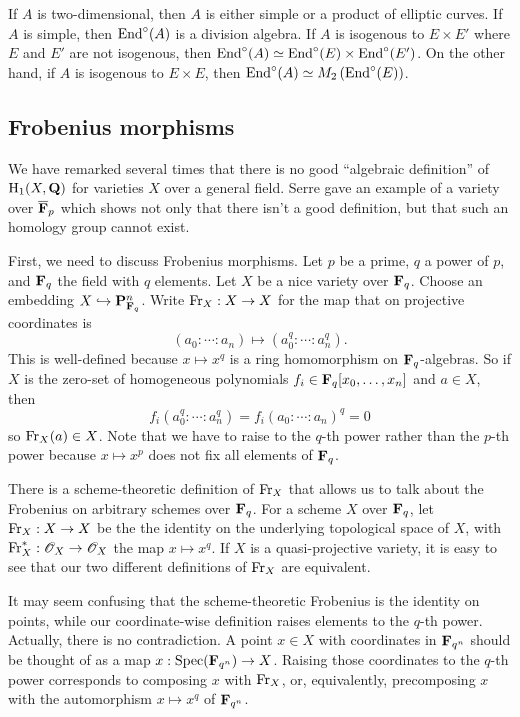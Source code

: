 \begin{example}
If $A$ is two-dimensional, then $A$ is either simple or a product of elliptic 
curves. If $A$ is simple, then $\operatorname{End}^\circ(A)$ is a division algebra. If $A$ 
is isogenous to $E\times E'$ where $E$ and $E'$ are not isogenous, then 
$\operatorname{End}^\circ(A)\simeq \operatorname{End}^\circ(E)\times \operatorname{End}^\circ(E')$. On the other hand, if 
$A$ is isogenous to $E\times E$, then 
$\operatorname{End}^\circ(A)\simeq M_2\left(\operatorname{End}^\circ(E)\right)$. 
\end{example}





\subsection{Frobenius morphisms}

We have remarked several times that there is no good ``algebraic definition'' 
of $\operatorname{H}_1(X,\mathbf{Q})$ for varieties $X$ over a general field. Serre gave an 
example of a variety over $\overline{\mathbf{F}}_p$ which shows not only that there 
isn't a good definition, but that such an homology group cannot exist. 

First, we need to discuss Frobenius morphisms. Let $p$ be a prime, $q$ a power 
of $p$, and $\mathbf{F}_q$ the field with $q$ elements. Let $X$ be a nice variety over 
$\mathbf{F}_q$. Choose an embedding $X\hookrightarrow \mathbf{P}_{\mathbf{F}_q}^n$. Write 
$\mathrm{Fr}_X:X\to X$ for the map that on projective coordinates is 
\[
  (a_0:\cdots:a_n) \mapsto (a_0^q:\cdots :a_n^q) \text{.}
\]
This is well-defined because $x\mapsto x^q$ is a ring homomorphism on 
$\mathbf{F}_q$-algebras. So if $X$ is the zero-set of homogeneous polynomials 
$f_i\in \mathbf{F}_q[x_0,\dots,x_n]$ and $a\in X$, then 
\[
  f_i(a_0^q:\cdots:a_n^q) = f_i(a_0:\cdots:a_n)^q = 0
\]
so $\mathrm{Fr}_X(a)\in X$. Note that we have to raise to the $q$-th power rather 
than the $p$-th power because $x\mapsto x^p$ does not fix all elements of 
$\mathbf{F}_q$. 

There is a scheme-theoretic definition of $\mathrm{Fr}_X$ that allows us to talk about 
the Frobenius on arbitrary schemes over $\mathbf{F}_q$. For a scheme $X$ over $\mathbf{F}_q$, let 
$\mathrm{Fr}_X:X\to X$ be the the identity on the underlying topological space of $X$, 
with $\mathrm{Fr}_X^\ast:\mathscr{O}_X\to \mathscr{O}_X$ the map $x\mapsto x^q$. If 
$X$ is a quasi-projective variety, it is easy to see that our two different 
definitions of $\mathrm{Fr}_X$ are equivalent. 

It may seem confusing that the scheme-theoretic Frobenius is the identity on 
points, while our coordinate-wise definition raises elements to the $q$-th 
power. Actually, there is no contradiction. A point $x\in X$ with coordinates in 
$\mathbf{F}_{q^n}$ should be thought of as a map $x:\operatorname{Spec}(\mathbf{F}_{q^n})\to X$. Raising 
those coordinates to the $q$-th power corresponds to composing $x$ with 
$\mathrm{Fr}_X$, or, equivalently, precomposing $x$ with the automorphism 
$x\mapsto x^q$ of $\mathbf{F}_{q^n}$. 



